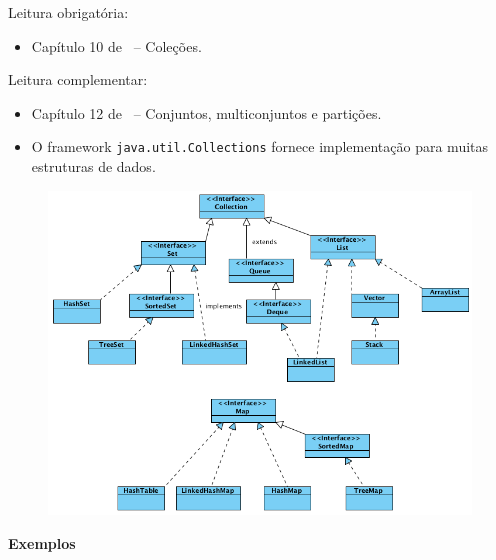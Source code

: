 \newcommand{\defs}{../defs}


\newcommand{\content}{Outras estruturas de dados lineares}
\newcommand{\class}{Algoritmos e Estruturas de Dados}
\newcommand{\shortcourse}{45EST}



\makeheader

Leitura obrigatória:
\begin{itemize}
	\item Capítulo 10 de~\cite{DeitelAndDeitel2010} -- Coleções.
\end{itemize}

Leitura complementar:
\begin{itemize}
	\item Capítulo 12 de~\cite{Preiss2001} -- Conjuntos, multiconjuntos e partições.
\end{itemize}

\medskip


\begin{itemize}
	\item O framework \texttt{java.util.Collections} fornece implementação para muitas estruturas de dados.
\end{itemize}

\begin{figure}[H]
	\centering
	\includegraphics[width=0.74\linewidth]{img/collections}
\end{figure}

\clearpage

\textbf{Exemplos}

